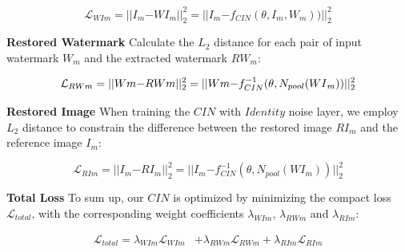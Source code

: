 \documentclass[sigconf]{acmart}
\begin{document}
\begin{equation}
    \mathcal{L}_{WIm}=||I_{m}\mathbf{-}WI_{m}||_{2}^{2}=||I_{m}\mathbf{-}f_{CIN}(\theta, I_{m}, W_{m}))||_{2}^{2}
    \label{LossWIm}
\end{equation}


\textbf{Restored Watermark}
Calculate the $L_{2}$ distance for each pair of input watermark $W_{m}$ and the extracted watermark $RW_{m}$:

\begin{equation}
     \mathcal{L}_{RWm}=||Wm\mathbf{-}RWm||_{2}^{2}=||Wm\mathbf\mathbf{-}f_{CIN}^{-1}(\theta, {N}_{pool}({WI}_{m}))||_{2}^{2}
     \label{LossRWm}
\end{equation}


\textbf{Restored Image}
When training the $CIN$ with $Identity$ noise layer, we employ $L_{2}$ distance to constrain the difference between the restored image $RI_{m}$ and the reference image $I_{m}$:

\begin{equation}
    \mathcal{L}_{RIm}=||I_{m}\mathbf{-} RI_{m}||_{2}^{2}=||I_{m}\mathbf{-}f_{CIN}^{-1}(\theta, {N}_{pool}(WI_{m}))||_{2}^{2}
    \label{LossRIm}
\end{equation}


\textbf{Total Loss}
To sum up, our $CIN$ is optimized by minimizing the compact loss $\mathcal{L}_{total}$, with the corresponding weight coefficients $\lambda_{WIm}$, $\lambda_{RWm}$ and $\lambda_{RIm}$:

\begin{equation}
\begin{aligned}
    \mathcal{L}_{total}=\lambda_{WIm} \mathcal{L}_{WIm}&+\lambda_{RWm} \mathcal{L}_{RWm}
    +\lambda_{RIm} \mathcal{L}_{RIm}
    \label{LossTotal}
\end{aligned}
\end{equation}
\end{document}
